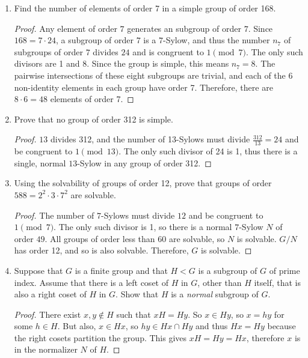 \documentclass[10pt]{article}
\begin{document}
\begin{enumerate}
\item Find the number of elements of order 7 in a simple group of order 168.
\begin{proof}
Any element of order $7$ generates an subgroup of order $7$.  Since $168 = 7 \cdot 24$, a subgroup of order $7$ is a $7$-Sylow, and thus the number $n_7$ of subgroups of order $7$ divides $24$ and is congruent to $1 \pmod{7}$.  The only such divisors are 1 and 8.  Since the group is simple, this means $n_7 = 8$.  The pairwise intersections of these eight subgroups are trivial, and each of the 6 non-identity elements in each group have order 7.  Therefore, there are $8 \cdot 6 = 48$ elements of order 7.
\end{proof}

\item Prove that no group of order 312 is simple.

\begin{proof}
$13$ divides 312, and the number of 13-Sylows must divide $\frac{312}{13} = 24$ and be congruent to $1 \pmod{13}$.  The only such divisor of 24 is 1, thus there is a single, normal $13$-Sylow in any group of order 312.
\end{proof}

\item Using the solvability of groups of order 12, prove that groups of order $588 = 2^2 \cdot 3 \cdot 7^2$ are solvable.

\begin{proof}
The number of $7$-Sylows must divide $12$ and be congruent to $1 \pmod{7}$.  The only such divisor is 1, so there is a normal $7$-Sylow $N$ of order $49$.  All groups of order less than $60$ are solvable, so $N$ is solvable.  $G/N$ has order 12, and so is also solvable.  Therefore, $G$ is solvable.
\end{proof}

\item Suppose that $G$ is a finite group and that $H < G$ is a subgroup of $G$ of prime index.  Assume that there is a left coset of $H$ in $G$, other than $H$ itself, that is also a right coset of $H$ in $G$.  Show that $H$ is a \emph{normal} subgroup of $G$.

\begin{proof}
There exist $x , y \not \in H$ such that $xH = Hy$.  So $x \in Hy$, so $x = hy$ for some $h \in H$.  But also, $x \in Hx$, so $hy \in Hx \cap Hy$ and thus $Hx = Hy$ because the right cosets partition the group.  This gives $xH = Hy = Hx$, therefore $x$ is in the normalizer $N$ of $H$.


\end{proof}
\end{enumerate}
\end{document}
